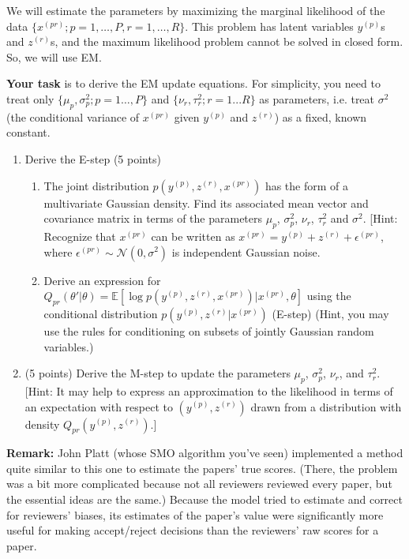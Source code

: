 \documentclass[12pt]{article}
\begin{document}
We will estimate the parameters by maximizing the marginal likelihood of the data $\{x^{(pr)}; p = 1,\ldots,P,r = 1,\ldots,R\}$. This problem has latent variables $y^{(p)}$s and $z^{(r)}$s, and the maximum likelihood problem cannot be solved in closed form. So, we will use EM. 

{\bf Your task} is to derive the EM update equations. For simplicity, you need to treat only $\{\mu_p,\sigma_p^2; p = 1\ldots,P\}$ and $\{\nu_r,\tau_r^2;r = 1...R\}$ as parameters, i.e. treat $\sigma^2$ (the conditional variance of $x^{(pr)}$ given $y^{(p)}$ and $z^{(r)}$) as a fixed, known constant.

\begin{enumerate}[label*=\arabic*.]
\item Derive the E-step (5 points)

\begin{enumerate}[label*=\arabic*.]
\item  The joint distribution $p(y^{(p)},z^{(r)},x^{(pr)})$ has the form of a multivariate Gaussian density. Find its associated mean vector and covariance matrix in terms of the parameters $\mu_p$, $\sigma_p^2$, $\nu_r$, $\tau_r^2$ and $\sigma^2$.
[Hint: Recognize that $x^{(pr)}$ can be written as $x^{(pr)} = y^{(p)} + z^{(r)} + \epsilon^{(pr)}$, where $\epsilon^{(pr)} \sim \mathcal{N}(0, \sigma^2)$ is independent Gaussian noise.

\item Derive an expression for $Q_{pr}(\theta'|\theta)  = \mathbb{E}[\log p(y^{(p)}, z^{(r)}, x^{(pr)})|x^{(pr)},\theta]$ using the conditional distribution $p(y^{(p)},z^{(r)}|x^{(pr)})$ (E-step) (Hint, you may use the rules for conditioning on subsets of jointly Gaussian random variables.) %
\end{enumerate}

\item (5 points) Derive the M-step to update the parameters $\mu_p$, $\sigma_p^2$, $\nu_r$, and $\tau_r^2$. [Hint: It may help to express an approximation to the likelihood in terms of an expectation with respect to $(y^{(p)}, z^{(r)})$ drawn from a distribution with density $Q_{pr}(y^{(p)}, z^{(r)})$.]

\end{enumerate}

{\bf Remark:} John Platt (whose SMO algorithm you've seen) implemented a method quite similar to this one to estimate the papers' true scores. (There, the problem was a bit more complicated because not all reviewers reviewed every paper, but the essential ideas are the same.) Because the model tried to estimate and correct for reviewers' biases, its estimates of the paper's value were significantly more useful for making accept/reject decisions than the reviewers' raw scores for a paper.
\end{document}
